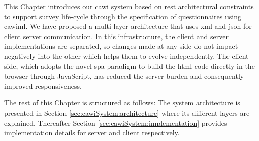 	This Chapter introduces our \gls{cawi} system based on \gls{rest} architectural constraints to support survey life-cycle through the specification of questionnaires using \gls{cawiml}. We have proposed a multi-layer architecture that uses \gls{xml} and \gls{json} for client server communication. In this infrastructure, the client and server implementations are separated, so changes made at any side do not impact negatively into the other which helps them to evolve independently. The client side, which adopts the novel \gls{spa} paradigm to build the \gls{html} code directly in the browser through JavaScript, has reduced the server burden and consequently improved responsiveness.

	The rest of this Chapter is structured as follows: The system architecture is presented in Section \ref{sec:cawiSystem:architecture} where its different layers are explained. Thereafter Section \ref{sec:cawiSystem:implementation} provides implementation details for server and client respectively.